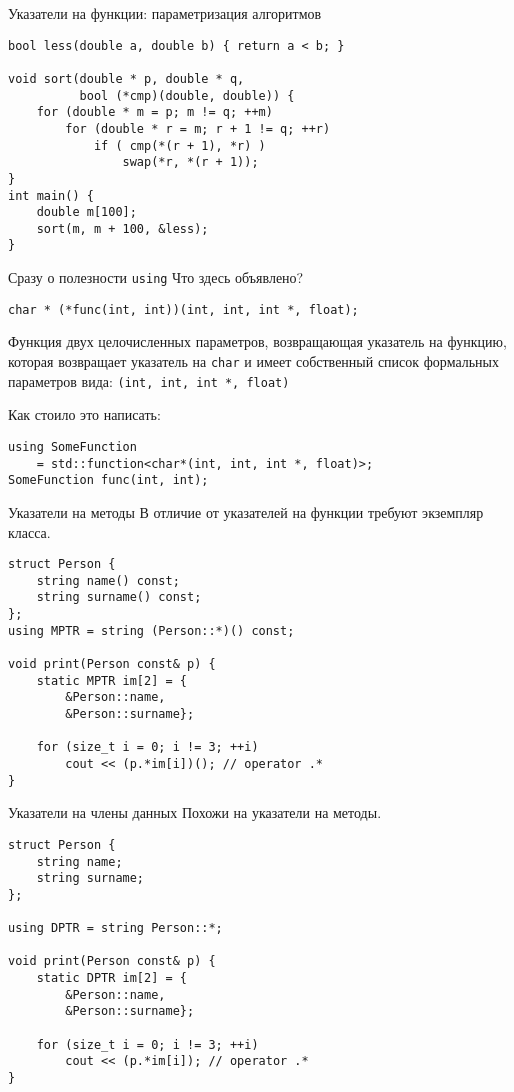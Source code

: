 \documentclass{beamer}
\begin{document}
\begin{frame}[fragile]{Указатели на функции: параметризация алгоритмов}
    \begin{lstlisting}
bool less(double a, double b) { return a < b; }

void sort(double * p, double * q,
          bool (*cmp)(double, double)) {
    for (double * m = p; m != q; ++m)
        for (double * r = m; r + 1 != q; ++r)
            if ( cmp(*(r + 1), *r) )
                swap(*r, *(r + 1));
}
int main() {
    double m[100];
    sort(m, m + 100, &less);
}
    \end{lstlisting}
\end{frame}
 
\begin{frame}[fragile]{Сразу о полезности \texttt{using}}
Что здесь объявлено?
    \begin{lstlisting}
char * (*func(int, int))(int, int, int *, float);
    \end{lstlisting}

Функция двух целочисленных параметров, возвращающая указатель на функцию,
которая возвращает указатель на \texttt{char} и имеет собственный список
формальных параметров вида: \texttt{(int, int, int *, float)}

\medskip

Как стоило это написать:
    \begin{lstlisting}
using SomeFunction 
    = std::function<char*(int, int, int *, float)>;
SomeFunction func(int, int);
    \end{lstlisting}
\end{frame}

\begin{frame}[fragile]{Указатели на методы}
\small
В отличие от указателей на функции требуют экземпляр класса.
    \begin{lstlisting}
struct Person {
    string name() const;
    string surname() const;
};
using MPTR = string (Person::*)() const;

void print(Person const& p) {
    static MPTR im[2] = {
        &Person::name, 
        &Person::surname};

    for (size_t i = 0; i != 3; ++i)
        cout << (p.*im[i])(); // operator .*
}
    \end{lstlisting}
\end{frame}


\begin{frame}[fragile]{Указатели на члены данных}
\small
    Похожи на указатели на методы.
    \begin{lstlisting}
struct Person {
    string name;
    string surname;
};

using DPTR = string Person::*;

void print(Person const& p) {
    static DPTR im[2] = {
        &Person::name,
        &Person::surname};

    for (size_t i = 0; i != 3; ++i)
        cout << (p.*im[i]); // operator .*
}
    \end{lstlisting}
\end{frame}
\end{document}
